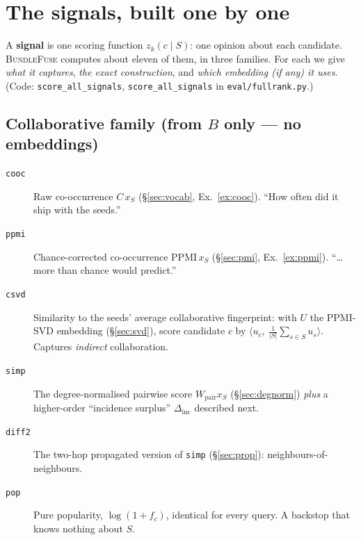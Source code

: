 \documentclass[11pt]{article}
\theoremstyle{remark}
\newcommand{\xs}{x_S}
\newcommand{\code}[1]{\texttt{\small #1}}
\begin{document}
\section{The signals, built one by one}
\label{sec:signals}

A \textbf{signal} is one scoring function $z_k(c\mid S)$: one opinion about each candidate. \textsc{BundleFuse}
computes about eleven of them, in three families. For each we give \emph{what it captures}, \emph{the exact
construction}, and \emph{which embedding (if any) it uses}. (Code: \code{score\_all\_signals},
\code{score\_all\_signals} in \code{eval/fullrank.py}.)

\subsection{Collaborative family (from $B$ only --- no embeddings)}

\begin{description}
\item[\code{cooc}] Raw co-occurrence $C\,\xs$ (\S\ref{sec:vocab}, Ex.~\ref{ex:cooc}). ``How often did it ship with
the seeds.''
\item[\code{ppmi}] Chance-corrected co-occurrence $\mathrm{PPMI}\,\xs$ (\S\ref{sec:pmi}, Ex.~\ref{ex:ppmi}).
``\dots more than chance would predict.''
\item[\code{csvd}] Similarity to the seeds' average collaborative fingerprint: with $U$ the PPMI-SVD embedding
(\S\ref{sec:svd}), score candidate $c$ by $\big\langle u_c,\ \tfrac1{|S|}\sum_{s\in S}u_s\big\rangle$. Captures
\emph{indirect} collaboration.
\item[\code{simp}] The degree-normalised pairwise score $W_{\text{pair}}\xs$ (\S\ref{sec:degnorm}) \emph{plus} a
higher-order ``incidence surplus'' $\Delta_{\text{inc}}$ described next.
\item[\code{diff2}] The two-hop propagated version of \code{simp} (\S\ref{sec:prop}): neighbours-of-neighbours.
\item[\code{pop}] Pure popularity, $\log(1+f_c)$, identical for every query. A backstop that knows nothing about $S$.
\end{description}
\end{document}

